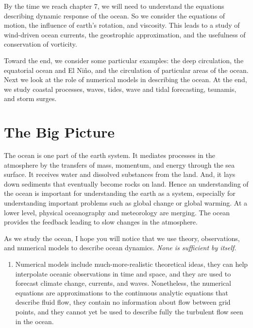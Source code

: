 By the time we reach chapter 7, we will need to understand the
equations describing dynamic response of the ocean. So we consider the
equations of motion, the influence of earth's rotation, and
viscosity. This leads to a study of wind-driven ocean currents, the
geostrophic approximation, and the
usefulness of conservation of vorticity.

Toward the end, we consider some particular examples: the deep
circulation, the equatorial ocean and El Ni\~{n}o, and the circulation
of particular areas of the ocean. Next we look at the role of
numerical models in describing the ocean.  At the end, we study
coastal processes, waves, tides, wave and tidal forecasting,
tsunamis, and storm surges.

\section{The Big Picture}
The ocean is one part of the earth system. It mediates processes in
the atmosphere by the transfers of mass, momentum, and energy through
the sea surface. It receives water and dissolved substances from the
land. And, it lays down sediments that eventually become rocks on
land. Hence an understanding of the ocean is important for
understanding the earth as a system, especially for understanding
important problems such as global change or global warming. At a lower
level, physical oceanography and meteorology are merging. The ocean
provides the feedback leading to slow changes in the atmosphere.

As we study the ocean, I hope you will notice that we use theory,
observations, and numerical models to describe ocean dynamics.
 \textit{None is sufficient
  by itself}.
\begin{enumerate}
\vitem Ocean processes are nonlinear and
turbulent. Yet we don't really understand the theory of non-linear,
turbulent flow in complex basins. Theories used to describe the ocean
are much simplified approximations to reality.

\vitem Observations are sparse in time and space.
They provide a rough description of the time-averaged flow, but many
processes in many regions are poorly observed.

\item Numerical models include
  much-more-realistic theoretical ideas, they can help interpolate
  oceanic observations in time and space, and they are used to
  forecast climate change, currents, and waves. Nonetheless, the
  numerical equations are approximations to the continuous analytic
  equations that describe fluid flow, they contain no information
  about flow between grid points, and they cannot yet be used to
  describe fully the turbulent flow seen in the ocean.
\end{enumerate}

